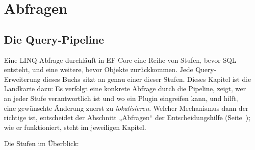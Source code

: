 \part{Abfragen}\label{part:queries}

\chapter{Die Query-Pipeline}\label{ch:the-query-pipeline}

Eine LINQ-Abfrage durchläuft in EF Core eine Reihe von Stufen, bevor SQL entsteht, und
eine weitere, bevor Objekte zurückkommen. Jede Query-Erweiterung dieses Buchs sitzt an
genau einer dieser Stufen. Dieses Kapitel ist die Landkarte dazu: Es verfolgt eine konkrete
Abfrage durch die Pipeline, zeigt, wer an jeder Stufe verantwortlich ist und wo ein Plugin
eingreifen kann, und hilft, eine gewünschte Änderung zuerst zu \emph{lokalisieren}. Welcher
Mechanismus dann der richtige ist, entscheidet der Abschnitt „Abfragen“ der
Entscheidungshilfe (Seite~\pageref{sec:decide-queries}); wie er funktioniert, steht im
jeweiligen Kapitel.

Die Stufen im Überblick:

